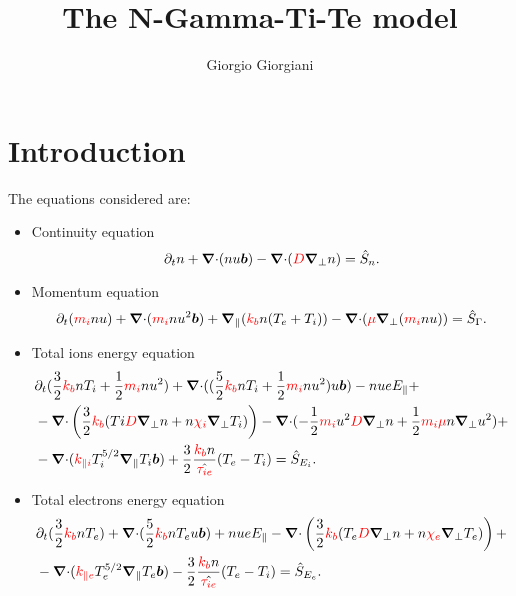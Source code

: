 \documentclass[a4paper,10pt]{article}
\def \tema{The N-Gamma-Ti-Te model}
\newcommand{\bm}[1]{\text{\boldmath$#1$\unboldmath}}
\newcommand{\Div}{{\bm{\nabla}\cdot}}
\newcommand{\Grad}{\bm{\nabla}}
\renewcommand{\b}{\bm{b}}
\newcommand{\Gradpar}{\Grad_{\parallel}}
\newcommand{\Gradper}{\Grad_{\perp}}
\newcommand{\Gm}{\Gamma}
\newcommand{\yd}[1]{{\color{red} #1\color{black}}} %
\def\kb{\yd{k_b}}
\def\mi{\yd{m_i}}
\def\kpi{\yd{k_{\parallel i}}}
\def\kpe{\yd{k_{\parallel e}}}
\def\drho{\yd{D}}
\def\dcon{\yd{\mu}}
\def\denei{\yd{\chi_i}}
\def\denee{\yd{\chi_e}}
\def\tie{\yd{\tau_{ie}}}
\begin{document}
\title{\tema}
\author{Giorgio Giorgiani}
\date{}  %
\maketitle

\section{Introduction}
The equations considered are: 
\begin{itemize}
 \item Continuity equation
 \begin{equation}
  \partial_t n + \Div (nu\b)-\Div(\drho \Gradper n) = \hat{S}_n.
 \end{equation}
 \item Momentum equation
 \begin{equation}
  \partial_t (\mi n u) + \Div(\mi n u^2 \b) + \Gradpar (\kb n (T_e+T_i) ) - \Div(\dcon\Gradper(\mi n u)) = \hat{S}_{\Gm}.
 \end{equation}
 \item Total ions energy equation
 \begin{equation}
 \begin{aligned}
  &\partial_t( \frac{3}{2}\kb n T_i+\frac{1}{2}\mi n u^2)+\Div((\frac{5}{2}\kb n T_i + \frac{1}{2}\mi n u^2)u\b) - nueE_{\parallel} 
  + \\ &-\Div \left(\frac{3}{2}\kb (Ti \drho \Gradper n + n \denei  \Gradper T_i)\right) - \Div(-\frac{1}{2}\mi u^2 \drho \Gradper n + \frac{1}{2}\mi \dcon n \Gradper u^2)+\\
  &-\Div(\kpi T_i^{5/2}\Gradpar T_i\b)+\frac{3}{2}\frac{\kb n}{\hat{\tie} }(T_e-T_i) =\hat{S}_{E_i}.
 \end{aligned}
 \end{equation}
  \item Total electrons energy equation
  \begin{equation}
   \begin{aligned}
    &\partial_t(\frac{3}{2}\kb n T_e) + \Div (\frac{5}{2}\kb n T_e u \b) + nueE_{\parallel} - \Div\left(\frac{3}{2}\kb(T_e \drho \Gradper n +  n \denee \Gradper T_e)\right) + \\ & - \Div(\kpe T_e^{5/2}\Gradpar T_e \b) - \frac{3}{2}\frac{\kb n}{\hat{\tie} }(T_e-T_i) = \hat{S}_{E_e}.
   \end{aligned}
  \end{equation}
\end{itemize}
\end{document}
